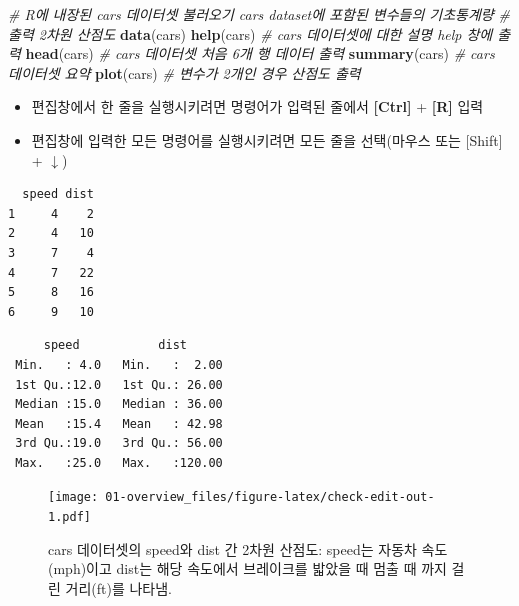 \documentclass[
  11pt,
]{krantz}
\newenvironment{Shaded}{\begin{snugshade}}{\end{snugshade}}
\newcommand{\CommentTok}[1]{\textcolor[rgb]{0.37,0.37,0.37}{\textit{#1}}}
\newcommand{\KeywordTok}[1]{\textcolor[rgb]{0.27,0.27,0.27}{\textbf{#1}}}
\newcommand{\NormalTok}[1]{#1}
\providecommand{\tightlist}{%
  \setlength{\itemsep}{0pt}\setlength{\parskip}{0pt}}
\begin{document}
\footnotesize

\begin{Shaded}
\begin{Highlighting}[]
\CommentTok{# R에 내장된 cars 데이터셋 불러오기 cars dataset에 포함된 변수들의 기초통계량}
\CommentTok{# 출력 2차원 산점도}
\KeywordTok{data}\NormalTok{(cars)}
\KeywordTok{help}\NormalTok{(cars)  }\CommentTok{# cars 데이터셋에 대한 설명 help 창에 출력}
\KeywordTok{head}\NormalTok{(cars)  }\CommentTok{# cars 데이터셋 처음 6개 행 데이터 출력}
\KeywordTok{summary}\NormalTok{(cars)  }\CommentTok{# cars 데이터셋 요약}
\KeywordTok{plot}\NormalTok{(cars)  }\CommentTok{# 변수가 2개인 경우 산점도 출력}
\end{Highlighting}
\end{Shaded}

\normalsize

\begin{itemize}
\tightlist
\item
  편집창에서 한 줄을 실행시키려면 명령어가 입력된 줄에서 \textbf{{[}Ctrl{]}} + \textbf{{[}R{]}} 입력
\item
  편집창에 입력한 모든 명령어를 실행시키려면 모든 줄을 선택(마우스 또는 {[}Shift{]} + \(\downarrow\))
\end{itemize}

\footnotesize

\begin{verbatim}
  speed dist
1     4    2
2     4   10
3     7    4
4     7   22
5     8   16
6     9   10
\end{verbatim}

\begin{verbatim}
     speed           dist       
 Min.   : 4.0   Min.   :  2.00  
 1st Qu.:12.0   1st Qu.: 26.00  
 Median :15.0   Median : 36.00  
 Mean   :15.4   Mean   : 42.98  
 3rd Qu.:19.0   3rd Qu.: 56.00  
 Max.   :25.0   Max.   :120.00  
\end{verbatim}

\begin{figure}
\centering
\texttt{[image: 01-overview\_files/figure-latex/check-edit-out-1.pdf]}
\caption{\label{fig:check-edit-out}cars 데이터셋의 speed와 dist 간 2차원 산점도: speed는 자동차 속도(mph)이고 dist는 해당 속도에서 브레이크를 밟았을 때 멈출 때 까지 걸린 거리(ft)를 나타냄.}
\end{figure}

\normalsize
\end{document}
